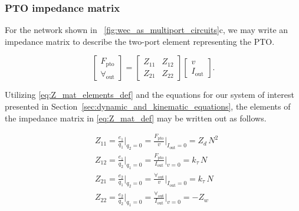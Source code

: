 \documentclass[lettersize,journal]{IEEEtran}
\begin{document}
\clearpage

\subsubsection{PTO impedance matrix}\label{sec:pto_impedance_matrix}

For the network shown in \figurename~\ref{fig:wec_as_multiport_circuits}c, we may write an impedance matrix to describe the two-port element representing the PTO.

\begin{equation}
        \label{eq:Z_mat_def}
        \begin{bmatrix} 
                F_{\textrm{pto}} \\
                \forall_{\textrm{out}} 
        \end{bmatrix} 
        = 
        \begin{bmatrix} 
                Z_{11} & Z_{12} \\ 
                Z_{21} & Z_{22} 
        \end{bmatrix} 
        \begin{bmatrix} 
                v \\
                I_{\textrm{out}} 
        \end{bmatrix} .
\end{equation}

Utilizing \eqref{eq:Z_mat_elements_def} and the equations for our system of interest presented in Section~\ref{sec:dynamic_and_kinematic_equations}, the elements of the impedance matrix in \eqref{eq:Z_mat_def} may be written out as follows.

\begin{subequations}
        \begin{align}
                &Z_{11} = \frac{e_1}{q_1} \bigg \vert_{q_2=0} 
                = \frac{F_{\textrm{pto}}}{v} \bigg \vert_{I_{\textrm{out}}=0} = Z_d \, N^2 \\[0.5em]
                &Z_{12} = \frac{e_1}{q_2} \bigg \vert_{q_1=0} 
                = \frac{F_{\textrm{pto}}}{I_{\textrm{out}}} \bigg \vert_{v=0} = k_\tau \, N \\[0.5em]
                &Z_{21} = \frac{e_2}{q_1} \bigg \vert_{q_2=0} 
                = \frac{\forall_{\textrm{out}}}{v} \bigg \vert_{I_{\textrm{out}}=0} = k_\tau \, N \\[0.5em]
                &Z_{22} = \frac{e_2}{q_2} \bigg \vert_{q_1=0} 
                = \frac{\forall_{\textrm{out}}}{I_{\textrm{out}}} \bigg \vert_{v=0} = -Z_w 
        \end{align}
\end{subequations}
\end{document}
